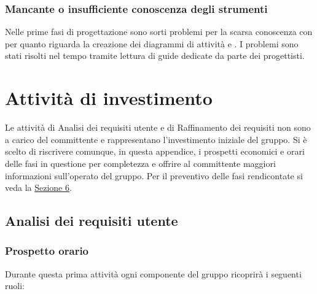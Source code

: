 \documentclass[a4paper, titlepage]{article}
\begin{document}
	\subsubsection{Mancante o insufficiente conoscenza degli strumenti}
	Nelle prime fasi di progettazione sono sorti problemi per la scarsa conoscenza con  per quanto riguarda la creazione dei diagrammi di attività e . I problemi sono stati risolti nel tempo tramite lettura di guide dedicate da parte dei progettisti.
	
	
	\newpage
	\section{Attività di investimento} \label{Investimento}
	Le attività di Analisi dei requisiti utente e di Raffinamento dei requisiti non sono a carico del committente e rappresentano l'investimento iniziale del gruppo. Si è scelto di riscrivere comunque, in questa appendice, i prospetti economici e orari delle fasi in questione per completezza e offrire al committente maggiori informazioni sull'operato del gruppo. Per il preventivo delle fasi rendicontate si veda la \hyperref[Preventivo] {Sezione 6}.
	
	
	\subsection{Analisi dei requisiti utente}
	\subsubsection{Prospetto orario}
	Durante questa prima attività ogni componente del gruppo ricoprirà i seguenti ruoli:
	
\end{document}
